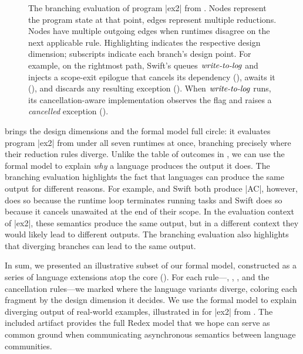 \begin{figure}[htb]
  
  \cprotect\caption{The branching evaluation of program \code|ex2| from . Nodes represent the program state at that point, edges represent multiple reductions. Nodes have multiple outgoing edges when runtimes disagree on the next applicable rule. Highlighting indicates the respective design dimension; subscripts indicate each branch's design point. For example, on the rightmost path, Swift's \seager {} queues $\text{\normalfont\textit{write-to-log}}$ and injects a scope-exit epilogue that cancels its dependency (\cdes{\destruction}), awaits it (\cext{\extent}), and discards any resulting exception (\cpro{\propagation}). When $\text{\normalfont\textit{write-to-log}}$ runs, its cancellation-aware  implementation observes the flag and raises a \emph{cancelled} exception (\cawa{\awareness}).}
  \label{fig:explain-tree}
\end{figure}

 brings the design dimensions and the formal model full circle: it evaluates program \code|ex2| from  under all seven runtimes at once, branching precisely where their reduction rules diverge. Unlike the table of outcomes in , we can use the formal model to explain \emph{why} a language produces the output it does. The branching evaluation highlights the fact that languages can produce the same output for different reasons. For example, \CSharp and Swift both produce \code|AC|, however, \CSharp does so because the runtime loop terminates running tasks and Swift does so because it cancels unawaited \tasks at the end of their scope. In the evaluation context of \code|ex2|, these semantics produce the same output, but in a different context they would likely lead to different outputs. The branching evaluation also highlights that diverging branches can lead to the same output.

In sum, we presented an illustrative subset of our formal model, constructed as a series of language extensions atop the core \lc (). For each rule---, , , and the cancellation rules---we marked where the language variants diverge, coloring each fragment by the design dimension it decides. We use the formal model to explain diverging output of real-world examples, illustrated in  for \code|ex2| from . The included artifact provides the full Redex model that we hope can serve as common ground when communicating asynchronous semantics between language communities.
